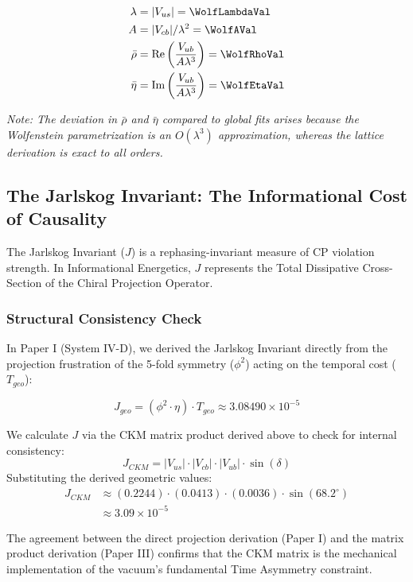 \begin{align}
    \lambda &= |V_{us}| = \WolfLambdaVal \\
    A &= |V_{cb}| / \lambda^2 = \WolfAVal \\
    \bar{\rho} &= \text{Re}\left(\frac{V_{ub}}{A\lambda^3}\right) = \WolfRhoVal \\
    \bar{\eta} &= \text{Im}\left(\frac{V_{ub}}{A\lambda^3}\right) = \WolfEtaVal
\end{align}

\textit{Note: The deviation in $\bar{\rho}$ and $\bar{\eta}$ compared to global fits arises because the Wolfenstein parametrization is an $O(\lambda^3)$ approximation, whereas the lattice derivation is exact to all orders.}



\subsection{The Jarlskog Invariant: The Informational Cost of Causality}

The Jarlskog Invariant ($J$) is a rephasing-invariant measure of CP violation strength. In Informational Energetics, $J$ represents the Total Dissipative Cross-Section of the Chiral Projection Operator.

\subsubsection{Structural Consistency Check}
In Paper I (System IV-D), we derived the Jarlskog Invariant directly from the projection frustration of the 5-fold symmetry ($\phi^2$) acting on the temporal cost ($T_{geo}$):

\begin{equation}
J_{geo} = (\phi^2 \cdot \eta) \cdot T_{geo} \approx 3.08490 \times 10^{-5}
\end{equation}

We calculate $J$ via the CKM matrix product derived above to check for internal consistency:
\begin{equation}
J_{CKM} = |V_{us}| \cdot |V_{cb}| \cdot |V_{ub}| \cdot \sin(\delta)
\end{equation}
Substituting the derived geometric values:
\begin{equation}
\begin{split}
J_{CKM} &\approx (0.2244) \cdot (0.0413) \cdot (0.0036) \cdot \sin(68.2^\circ) \\
        &\approx 3.09 \times 10^{-5}
\end{split}
\end{equation}

The agreement between the direct projection derivation (Paper I) and the matrix product derivation (Paper III) confirms that the CKM matrix is the mechanical implementation of the vacuum's fundamental Time Asymmetry constraint.